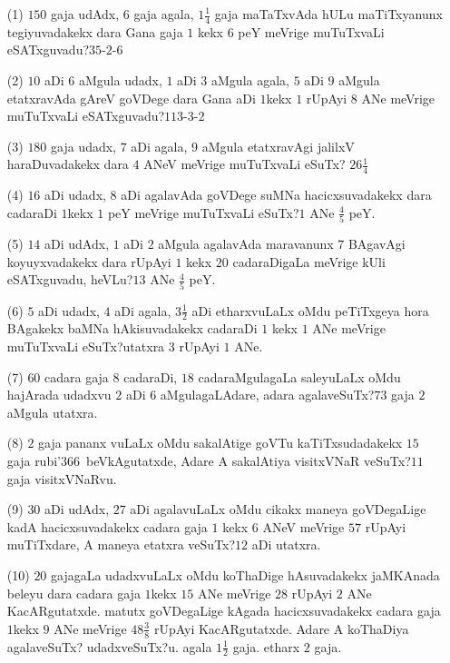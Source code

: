 \begin{itemize}
\item[\rm(1)] $150$ gaja udAdx, $6$ gaja agala, $1\frac{1}{4}$ gaja
  maTaTxvAda hULu maTiTxyanunx tegiyuvadakekx dara Gana gaja $1$ kekx
  $6$ peY meVrige muTuTxvaLi eSATxguvadu?\hfill $35$-$2$-$6$

\item[\rm(2)] $10$ aDi $6$ aMgula udadx, $1$ aDi $3$ aMgula agala, $5$
  aDi $9$ aMgula etatxravAda gAreV goVDege dara Gana aDi $1$kekx $1$
  rUpAyi $8$ ANe meVrige muTuTxvaLi eSATxguvadu?\hfill $113$-$3$-$2$

\item[\rm(3)] $180$ gaja udadx, $7$ aDi agala, $9$ aMgula etatxravAgi
  jalilxV haraDuvadakekx dara $4$ ANeV meVrige muTuTxvaLi eSuTx?\hfill
  $26\frac{1}{4}$

\item[\rm(4)] $16$ aDi udadx, $8$ aDi agalavAda goVDege suMNa
  hacicxsuvadakekx dara cadaraDi $1$kekx $1$ peY meVrige muTuTxvaLi
  eSuTx?\hfill $1$ ANe $\frac{4}{5}$ peY.

\item[\rm(5)] $14$ aDi udAdx, $1$ aDi $2$ aMgula agalavAda maravanunx
  $7$ BAgavAgi koyuyxvadakekx dara rUpAyi $1$ kekx $20$ cadaraDigaLa
  meVrige kUli eSATxguvadu, heVLu?\hfill $13$ ANe $\frac{4}{5}$ peY.

\item[\rm(6)] $5$ aDi udadx, $4$ aDi agala, $3\frac{1}{2}$ aDi
  etharxvuLaLx oMdu peTiTxgeya hora BAgakekx baMNa hAkisuvadakekx
  cadaraDi $1$ kekx $1$ ANe meVrige muTuTxvaLi eSuTx?\hfill utatxra
  $3$ rUpAyi $1$ ANe.

\item[\rm(7)] $60$ cadara gaja $8$ cadaraDi, $18$ cadaraMgulagaLa
  saleyuLaLx oMdu hajArada udadxvu $2$ aDi $6$ aMgulagaLAdare, adara
  agalaveSuTx?\hfill $73$ gaja $2$ aMgula utatxra.

\item[\rm(8)] $2$ gaja pananx vuLaLx oMdu sakalAtige goVTu
  kaTiTxsudadakekx $15$ gaja rubi\char'366\ beVkAgutatxde, Adare A
  sakalAtiya visitxVNaR veSuTx?\hfill $11$ gaja visitxVNaRvu.

\item[\rm(9)] $30$ aDi udAdx, $27$ aDi agalavuLaLx oMdu cikakx maneya
  goVDegaLige kadA hacicxsuvadakekx cadara gaja $1$ kekx $6$ ANeV
  meVrige $57$ rUpAyi muTiTxdare, A maneya etatxra veSuTx?\hfill $12$
  aDi utatxra.

\item[\rm(10)] $20$ gajagaLa udadxvuLaLx oMdu koThaDige hAsuvadakekx
  jaMKAnada beleyu dara cadara gaja $1$kekx $15$ ANe meVrige $28$
  rUpAyi $2$ ANe KacARgutatxde. matutx goVDegaLige kAgada
  hacicxsuvadakekx cadara gaja $1$kekx $9$ ANe meVrige $48\frac{3}{8}$
  rUpAyi KacARgutatxde. Adare A koThaDiya agalaveSuTx?
  udadxveSuTx?\hfill u. agala $1\frac{1}{2}$ gaja. etharx $2$ gaja.


\end{itemize}
